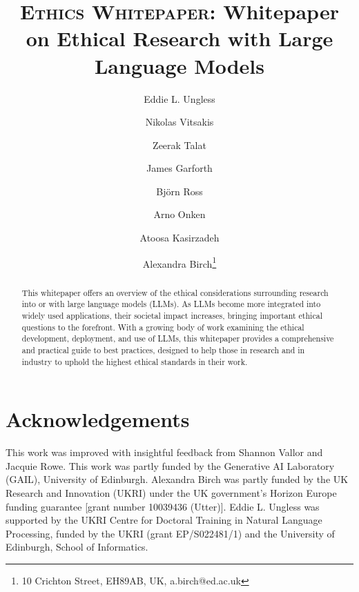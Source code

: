 \documentclass[sigconf,anonymous]{clv3}
\begin{document}
\title{\textsc{Ethics Whitepaper}: Whitepaper on Ethical Research with Large Language Models}

\author{Eddie L. Ungless}

\author{Nikolas Vitsakis}

\author{Zeerak Talat}

\author{James Garforth}

\author{Björn Ross}

\author{Arno Onken}

\author{Atoosa Kasirzadeh}

\author{Alexandra Birch\thanks{10 Crichton Street, EH89AB, UK, a.birch@ed.ac.uk}}



\maketitle

\begin{abstract}
This whitepaper offers an overview of the ethical considerations surrounding research into or with large language models (LLMs). As LLMs become more integrated into widely used applications, their societal impact increases, bringing important ethical questions to the forefront. With a growing body of work examining the ethical development, deployment, and use of LLMs, this whitepaper provides a comprehensive and practical guide to best practices, designed to help those in research and in industry to uphold the highest ethical standards in their work.

\end{abstract}












\section*{Acknowledgements}

This work was improved with insightful feedback from Shannon Vallor and Jacquie Rowe. This work was partly funded by the Generative AI Laboratory (GAIL), University of Edinburgh. Alexandra Birch was partly funded by the UK Research and Innovation (UKRI) under the UK government’s Horizon Europe funding guarantee [grant number 10039436 (Utter)]. Eddie L. Ungless was supported by the UKRI Centre for Doctoral Training in Natural Language Processing, funded by the UKRI (grant EP/S022481/1) and the University of Edinburgh, School of Informatics.






\appendix

\end{document}
